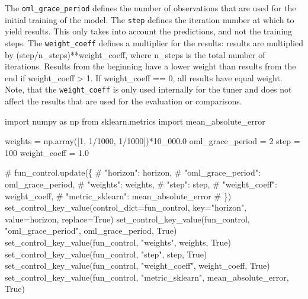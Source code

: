 \documentclass[
  letterpaper,
  DIV=11,
  numbers=noendperiod]{scrreprt}
\newenvironment{Shaded}{\begin{snugshade}}{\end{snugshade}}
\newcommand{\CommentTok}[1]{\textcolor[rgb]{0.37,0.37,0.37}{#1}}
\newcommand{\DecValTok}[1]{\textcolor[rgb]{0.68,0.00,0.00}{#1}}
\newcommand{\FloatTok}[1]{\textcolor[rgb]{0.68,0.00,0.00}{#1}}
\newcommand{\ImportTok}[1]{\textcolor[rgb]{0.00,0.46,0.62}{#1}}
\newcommand{\NormalTok}[1]{\textcolor[rgb]{0.00,0.23,0.31}{#1}}
\newcommand{\OperatorTok}[1]{\textcolor[rgb]{0.37,0.37,0.37}{#1}}
\newcommand{\StringTok}[1]{\textcolor[rgb]{0.13,0.47,0.30}{#1}}
\newcommand{\VariableTok}[1]{\textcolor[rgb]{0.07,0.07,0.07}{#1}}
\begin{document}
The \texttt{oml\_grace\_period} defines the number of observations that
are used for the initial training of the model. The \texttt{step}
defines the iteration number at which to yield results. This only takes
into account the predictions, and not the training steps. The
\texttt{weight\_coeff} defines a multiplier for the results: results are
multiplied by (step/n\_steps)**weight\_coeff, where n\_steps is the
total number of iterations. Results from the beginning have a lower
weight than results from the end if weight\_coeff \textgreater{} 1. If
weight\_coeff == 0, all results have equal weight. Note, that the
\texttt{weight\_coeff} is only used internally for the tuner and does
not affect the results that are used for the evaluation or comparisons.

\begin{Shaded}
\begin{Highlighting}[]
\ImportTok{import}\NormalTok{ numpy }\ImportTok{as}\NormalTok{ np}
\ImportTok{from}\NormalTok{ sklearn.metrics }\ImportTok{import}\NormalTok{ mean\_absolute\_error}

\NormalTok{weights }\OperatorTok{=}\NormalTok{ np.array([}\DecValTok{1}\NormalTok{, }\DecValTok{1}\OperatorTok{/}\DecValTok{1000}\NormalTok{, }\DecValTok{1}\OperatorTok{/}\DecValTok{1000}\NormalTok{])}\OperatorTok{*}\FloatTok{10\_000.0}
\NormalTok{oml\_grace\_period }\OperatorTok{=} \DecValTok{2}
\NormalTok{step }\OperatorTok{=} \DecValTok{100}
\NormalTok{weight\_coeff }\OperatorTok{=} \FloatTok{1.0}

\CommentTok{\# fun\_control.update(\{}
\CommentTok{\#                "horizon": horizon,}
\CommentTok{\#                "oml\_grace\_period": oml\_grace\_period,}
\CommentTok{\#                "weights": weights,}
\CommentTok{\#                "step": step,}
\CommentTok{\#                "weight\_coeff": weight\_coeff,}
\CommentTok{\#                "metric\_sklearn": mean\_absolute\_error}
\CommentTok{\#                \})}
\NormalTok{set\_control\_key\_value(control\_dict}\OperatorTok{=}\NormalTok{fun\_control,}
\NormalTok{                        key}\OperatorTok{=}\StringTok{"horizon"}\NormalTok{,}
\NormalTok{                        value}\OperatorTok{=}\NormalTok{horizon,}
\NormalTok{                        replace}\OperatorTok{=}\VariableTok{True}\NormalTok{)}
\NormalTok{set\_control\_key\_value(fun\_control, }\StringTok{"oml\_grace\_period"}\NormalTok{, oml\_grace\_period, }\VariableTok{True}\NormalTok{)}
\NormalTok{set\_control\_key\_value(fun\_control, }\StringTok{"weights"}\NormalTok{, weights, }\VariableTok{True}\NormalTok{)}
\NormalTok{set\_control\_key\_value(fun\_control, }\StringTok{"step"}\NormalTok{, step, }\VariableTok{True}\NormalTok{)}
\NormalTok{set\_control\_key\_value(fun\_control, }\StringTok{"weight\_coeff"}\NormalTok{, weight\_coeff, }\VariableTok{True}\NormalTok{)}
\NormalTok{set\_control\_key\_value(fun\_control, }\StringTok{"metric\_sklearn"}\NormalTok{, mean\_absolute\_error, }\VariableTok{True}\NormalTok{)}
\end{Highlighting}
\end{Shaded}
\end{document}
